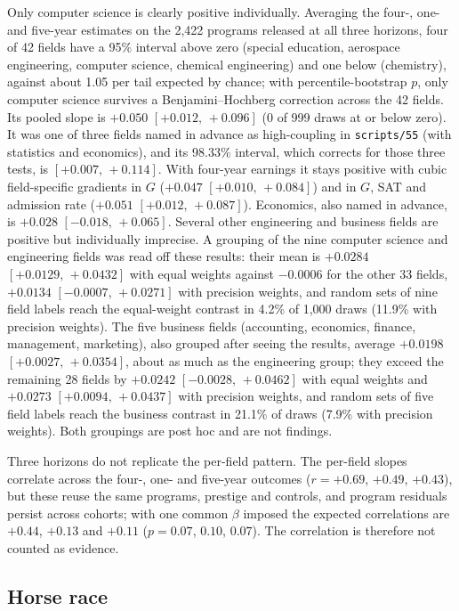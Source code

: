 \documentclass[11pt]{article}
\newcommand{\ci}[2]{$[#1,\allowbreak\,#2]$}
\newcommand{\scr}[1]{\texttt{scripts/#1}}
\begin{document}
Only computer science is clearly positive individually. Averaging the four-, one- and five-year estimates on the
2,422 programs released at all three horizons, four of 42 fields have a 95\% interval above zero (special education,
aerospace engineering, computer science, chemical engineering) and one below (chemistry), against about 1.05 per tail
expected by chance; with percentile-bootstrap $p$, only computer science survives a Benjamini--Hochberg correction
across the 42 fields. Its pooled slope is $+0.050$ \ci{+0.012}{+0.096} (0 of 999 draws at or
below zero). It was one of three fields named in advance as high-coupling in \scr{55} (with statistics and
economics), and its 98.33\% interval, which corrects for those three tests, is \ci{+0.007}{+0.114}. With
four-year earnings it stays positive with cubic field-specific gradients in $G$ ($+0.047$ \ci{+0.010}{+0.084}) and in
$G$, SAT and admission rate ($+0.051$ \ci{+0.012}{+0.087}). Economics, also named in advance, is $+0.028$ \ci{-0.018}{+0.065}. Several other engineering and
business fields are positive but individually imprecise. A
grouping of the nine computer science and engineering fields was read off these results: their mean is $+0.0284$
\ci{+0.0129}{+0.0432} with equal weights against $-0.0006$ for the other 33 fields, $+0.0134$ \ci{-0.0007}{+0.0271}
with precision weights, and random sets of nine field labels reach the equal-weight contrast in 4.2\% of 1,000
draws (11.9\% with precision weights). The five business fields (accounting, economics, finance, management,
marketing), also grouped after seeing the results, average $+0.0198$ \ci{+0.0027}{+0.0354}, about as much as
the engineering group; they exceed the remaining 28 fields by $+0.0242$ \ci{-0.0028}{+0.0462} with equal
weights and $+0.0273$ \ci{+0.0094}{+0.0437} with precision weights, and random sets of five field labels reach
the business contrast in 21.1\% of draws (7.9\% with precision weights). Both groupings are post hoc and are
not findings.

Three horizons do not replicate the per-field pattern. The per-field slopes correlate across the four-, one- and
five-year outcomes ($r=+0.69$, $+0.49$, $+0.43$), but these reuse the same programs, prestige and controls, and
program residuals persist across cohorts; with one common $\beta$ imposed the expected correlations are $+0.44$,
$+0.13$ and $+0.11$ ($p=0.07$, $0.10$, $0.07$). The correlation is therefore not counted as evidence.

\subsection{Horse race}\label{sec:horse}
\end{document}
